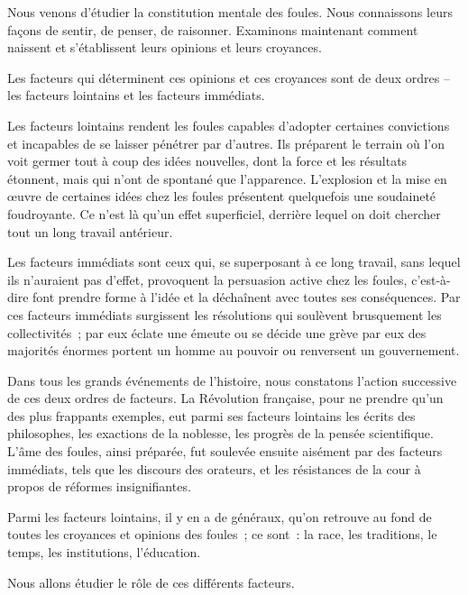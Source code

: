 \documentclass[french,twoside]{book} %
\begin{document}
\noindent Nous venons d’étudier la constitution mentale des fou­les. Nous connaissons leurs façons de sentir, de penser, de raisonner. Examinons maintenant comment naissent et s’établissent leurs opinions et leurs croyances.\par
Les facteurs qui déterminent ces opinions et ces croyances sont de deux ordres – les facteurs lointains et les facteurs immédiats.\par
Les facteurs lointains rendent les foules capables d’adopter certaines convictions et incapables de se laisser pénétrer par d’autres. Ils préparent le terrain où l’on voit germer tout à coup des idées nouvelles, dont la force et les résultats étonnent, mais qui n’ont de spontané que l’apparence. L’explosion et la mise en œuvre de certaines idées chez les foules présentent quelquefois une soudaineté foudroyante. Ce n’est là qu’un effet superficiel, derrière lequel on doit chercher tout un long travail antérieur.\par
Les facteurs immédiats sont ceux qui, se superposant à ce long travail, sans lequel ils n’auraient pas d’effet, provoquent la persuasion active chez les foules, c’est-à-dire font prendre forme à l’idée et la déchaînent avec toutes ses conséquences. Par ces facteurs immédiats surgissent les résolutions qui soulèvent brusquement les collecti­vités ; par eux éclate une émeute ou se décide une grève par eux des majorités énor­mes portent un homme au pouvoir ou renversent un gouvernement.\par
Dans tous les grands événements de l’histoire, nous constatons l’action successive de ces deux ordres de facteurs. La Révolution française, pour ne prendre qu’un des plus frappants exemples, eut parmi ses facteurs lointains les écrits des philosophes, les exactions de la noblesse, les progrès de la pensée scientifique. L’âme des foules, ainsi préparée, fut soulevée ensuite aisément par des facteurs immédiats, tels que les discours des orateurs, et les résistances de la cour à propos de réformes insignifiantes.\par
Parmi les facteurs lointains, il y en a de généraux, qu’on retrouve au fond de toutes les croyances et opinions des foules ; ce sont : la race, les traditions, le temps, les institutions, l’éducation.\par
Nous allons étudier le rôle de ces différents facteurs.\par
\end{document}
